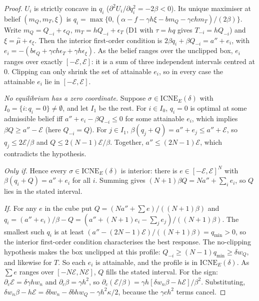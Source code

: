 \documentclass[11pt]{article}
\theoremstyle{definition}
\theoremstyle{remark}
\newcommand{\ICNE}{\mathrm{ICNE}}
\begin{document}
\begin{proof}
$U_i$ is strictly concave in $q_i$ ($\partial^2U_i/\partial q_i^2=-2\beta<0$). Its unique maximiser at belief $(m_Q,m_T,\xi)$ is $q_i=\max\{0,(\alpha-f-\gamma h\xi-bm_Q-\gamma chm_T)/(2\beta)\}$. Write $m_Q=Q_{-i}+\epsilon_Q$, $m_T=hQ_{-i}+\epsilon_T$ (D1 with $\tau=hq$ gives $T_{-i}=hQ_{-i}$) and $\xi=\hat\mu+\epsilon_\xi$. Then the interior first-order condition is $2\beta q_i+\beta Q_{-i}=a''+e_i$, with $e_i=-(b\epsilon_Q+\gamma ch\epsilon_T+\gamma h\epsilon_\xi)$. As the belief ranges over the unclipped box, $e_i$ ranges over exactly $[-\mathcal E,\mathcal E]$: it is a sum of three independent intervals centred at $0$. Clipping can only shrink the set of attainable $e_i$, so in every case the attainable $e_i$ lie in $[-\mathcal E,\mathcal E]$.

\emph{No equilibrium has a zero coordinate.} Suppose $\sigma\in\ICNE_E(\delta)$ with $I_0=\{i:q_i=0\}\ne\emptyset$, and let $I_1$ be the rest. For $i\in I_0$, $q_i=0$ is optimal at some admissible belief iff $a''+e_i-\beta Q_{-i}\le0$ for some attainable $e_i$, which implies $\beta Q\ge a''-\mathcal E$ (here $Q_{-i}=Q$). For $j\in I_1$, $\beta(q_j+Q)=a''+e_j\le a''+\mathcal E$, so $q_j\le2\mathcal E/\beta$ and $Q\le2(N-1)\mathcal E/\beta$. Together, $a''\le(2N-1)\mathcal E$, which contradicts the hypothesis.

\emph{Only if.} Hence every $\sigma\in\ICNE_E(\delta)$ is interior: there is $e\in[-\mathcal E,\mathcal E]^N$ with $\beta(q_i+Q)=a''+e_i$ for all $i$. Summing gives $(N+1)\beta Q=Na''+\sum_ie_i$, so $Q$ lies in the stated interval.

\emph{If.} For any $e$ in the cube put $Q=(Na''+\sum e)/((N+1)\beta)$ and $q_i=(a''+e_i)/\beta-Q=(a''+(N+1)e_i-\sum_je_j)/((N+1)\beta)$. The smallest such $q_i$ is at least $(a''-(2N-1)\mathcal E)/((N+1)\beta)=q_{\min}>0$, so the interior first-order condition characterises the best response. The no-clipping hypothesis makes the box unclipped at this profile: $Q_{-i}\ge(N-1)q_{\min}\ge\delta w_Q$, and likewise for $T$. So each $e_i$ is attainable, and the profile is in $\ICNE_E(\delta)$. As $\sum e$ ranges over $[-N\mathcal E,N\mathcal E]$, $Q$ fills the stated interval. For the sign: $\partial_c\mathcal E=\delta\gamma hw_n$ and $\partial_c\beta=\gamma h^2$, so $\partial_c(\mathcal E/\beta)=\gamma h[\delta w_n\beta-h\mathcal E]/\beta^2$. Substituting, $\delta w_n\beta-h\mathcal E=\delta bw_n-\delta bhw_Q-\gamma h^2\kappa/2$, because the $\gamma ch^2$ terms cancel.
\end{proof}
\end{document}
